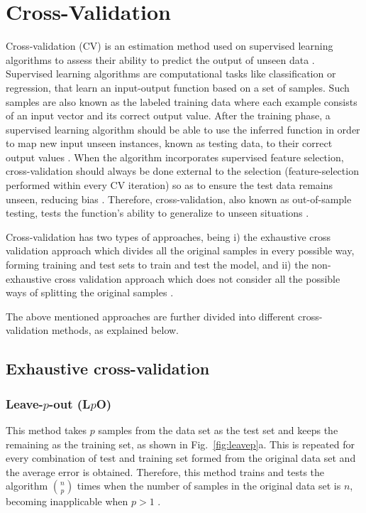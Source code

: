 \chapter{Cross-Validation}
\label{ch:cross-validation}

Cross-validation (CV) is an estimation method used on supervised learning algorithms to assess their ability to predict the output of unseen data \citep{varma2006bias,kohavi1995study}. Supervised learning algorithms are computational tasks like classification or regression, that learn an input-output function based on a set of samples. Such samples are also known as the labeled training data where each example consists of an input vector and its correct output value. After the training phase, a supervised learning algorithm should be able to use the inferred function in order to map new input unseen instances, known as testing data, to their correct output values \citep{caruana2006empirical}. When the algorithm incorporates supervised feature selection, cross-validation should always be done external to the selection (feature-selection performed within every CV iteration) so as to ensure the test data remains unseen, reducing bias \citep{ambroise2002selection, friedman2001elements}.  Therefore, cross-validation, also known as out-of-sample testing, tests the function's ability to generalize to unseen situations \citep{varma2006bias,kohavi1995study}. 

Cross-validation has two types of approaches, being i) the exhaustive cross validation approach which divides all the original samples in every possible way, forming training and test sets to train and test the model, and ii) the non-exhaustive cross validation approach which does not consider all the possible ways of splitting the original samples \citep{arlot2010survey}. 

The above mentioned approaches are further divided into different cross-validation methods, as explained below.

\section{Exhaustive cross-validation}

\subsection{Leave-$p$-out (L$p$O)} 
This method takes $p$ samples from the data set as the test set and keeps the remaining as the training set, as shown in Fig.~\ref{fig:leavep}a. This is repeated for every combination of test and training set formed from the original data set and the average error is obtained. Therefore, this method trains and tests the algorithm $n\choose p$ times when the number of samples in the original data set is $n$, becoming inapplicable when $p>1$ \citep{arlot2010survey}.

